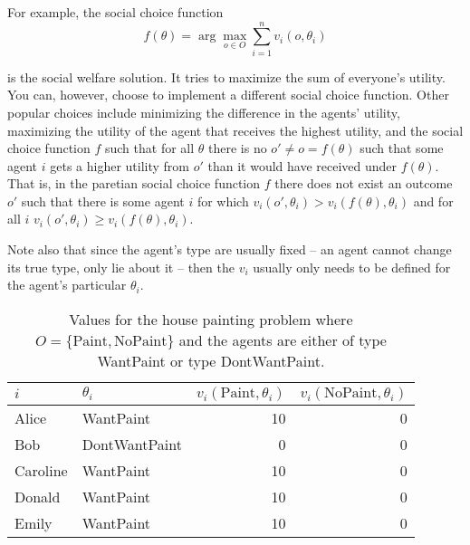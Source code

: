 For example, the social choice function
\begin{equation}
  \label{eq:sc-sw}
  f(\theta) = \arg \max_{o \in O} \sum_{i=1}^n v_i(o,\theta_i)
\end{equation}

is the social welfare solution. It tries to maximize the sum of
everyone's utility. You can, however, choose to implement a different
social choice function. Other popular choices include minimizing the
difference in the agents' utility, maximizing the utility of the agent
that receives the highest utility, and the  social choice
function $f$ such that for all $\theta$ there is no $o' \neq o =
f(\theta)$ such that some agent $i$ gets a higher utility from $o'$
than it would have received under $f(\theta)$. That is, in the
paretian social choice function $f$ there does not exist an outcome
$o'$ such that there is some agent $i$ for which $v_i(o',\theta_i) >
v_i(f(\theta),\theta_i)$ and for all $i$ $v_i(o',\theta_i) \geq
v_i(f(\theta),\theta_i)$.

Note also that since the agent's type are usually fixed -- an agent
cannot change its true type, only lie about it -- then the $v_i$
usually only needs to be defined for the agent's particular
$\theta_i$.

\begin{SCtable}
  \begin{minipage}{1.0\linewidth}
    \begin{center}
      \begin{tabular}{llrr} \toprule
        $i$ & $\theta_i$ & $v_i(\text{Paint},\theta_i)$ & $v_i(\text{NoPaint},\theta_i)$ \\ \midrule
        Alice & WantPaint & 10 & 0 \\ 
        Bob & DontWantPaint & 0 & 0\\ 
        Caroline & WantPaint & 10 & 0\\ 
        Donald & WantPaint & 10 & 0\\ 
        Emily & WantPaint & 10 & 0\\ \bottomrule
      \end{tabular}
    \end{center}
  \end{minipage}
  \caption{Values for the house painting problem where $O =
    \{\text{Paint}, \text{NoPaint}\}$ and the agents are either of
    type WantPaint or type DontWantPaint. }
  \label{tab:d2}
\end{SCtable}


